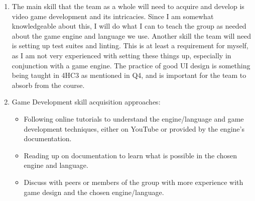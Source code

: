 \documentclass{scrreprt}
\theoremstyle{definition}
\begin{document}
\begin{enumerate}
\begin{itemize}
			\item SFWRENG 4HC3: This course is teaching about how to build effective user interfaces and experiences, which
			will help build usable knowledge for the project since UI and various design principles described in this course are
			all very important to the success of this project.

			\item SFWRENG 3RA3: As mentioned in question 1, the group all has experience with the Meyer SRS template
			introduced in this course and also gained important information about requirements from this course.

			\item SFWRENG 3S03: Software testing knowledge from this course will be integral to how we approach the
			project.

			\item SFWRENG 2XC3: This course was an introduction to many core concepts we use in this project, such as
			version control, testing, debugging, and CI/CD.
	
		\end{itemize}

		\item The main skill that the team as a whole will need to acquire and develop is video game development and its
		intricacies. Since I am somewhat knowledgeable about this, I will do what I can to teach the group as needed about the
		game engine and language we use. Another skill the team will need is setting up test suites and linting. This is at least a
		requirement for myself, as I am not very experienced with setting these things up, especially in conjunction with a game
		engine. The practice of good UI design is something being taught in 4HC3 as mentioned in Q4, and is important for the
		team to absorb from the course.

		\item Game Development skill acquisition approaches:
		\begin{itemize}
			\item Following online tutorials to understand the engine/language and game development techniques, either on
			YouTube or provided by the engine's documentation.
			\item Reading up on documentation to learn what is possible in the chosen engine and language.
			\item Discuss with peers or members of the group with more experience with game design and the chosen
			engine/language.	
		\end{itemize}


\end{enumerate}
\end{document}

